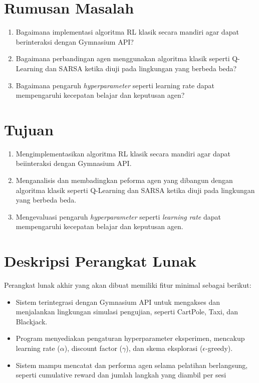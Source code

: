 \documentclass[a4paper,twoside]{article}
\begin{document}
	
	\section{Rumusan Masalah}
	\begin{enumerate}
		\item Bagaimana implementasi algoritma RL klasik secara mandiri agar dapat berinteraksi dengan Gymnasium API?
		\item Bagaimana perbandingan agen menggunakan algoritma klasik seperti Q-Learning dan SARSA  ketika diuji pada lingkungan yang berbeda beda?
		\item Bagaimana pengaruh \textit{hyperparameter} seperti learning rate dapat mempengaruhi kecepatan belajar dan keputusan agen?
	\end{enumerate}
	
	\section{Tujuan}
	\begin{enumerate}
		\item Mengimplementasikan algoritma RL klasik secara mandiri agar dapat beiinteraksi dengan Gymnasium API.
		\item Menganalisis dan membadingkan peforma agen yang dibangun dengan algoritma klasik seperti Q-Learning dan SARSA ketika diuji pada lingkungan yang berbeda beda.
		\item Mengevaluasi pengaruh \textit{hyperparameter} seperti \textit{learning rate} dapat mempengaruhi kecepatan belajar dan keputusan agen.
	\end{enumerate}
	
	\section{Deskripsi Perangkat Lunak}	
	Perangkat lunak akhir yang akan dibuat memiliki fitur minimal sebagai berikut:
	\begin{itemize}
		\item Sistem terintegrasi dengan Gymnasium API untuk mengakses dan menjalankan lingkungan simulasi pengujian, seperti CartPole, Taxi, dan Blackjack.  
		
		\item Program menyediakan pengaturan hyperparameter eksperimen, mencakup learning rate ($\alpha$), discount factor ($\gamma$), dan skema eksplorasi ($\epsilon$-greedy).  
		
		\item Sistem mampu mencatat dan performa agen selama pelatihan berlangsung, seperti cumulative reward dan jumlah langkah yang diambil per sesi
	\end{itemize}
	
\end{document}
